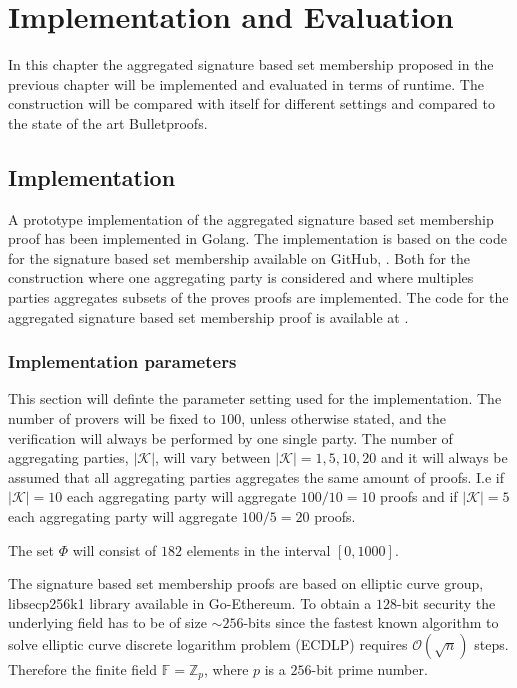 \chapter{Implementation and Evaluation}
\label{ch:results}
In this chapter the aggregated signature based set membership proposed in the previous chapter will be implemented and evaluated in terms of runtime. The construction will be compared with itself for different settings and compared to the state of the art Bulletproofs. 

\section{Implementation}
A prototype implementation of the aggregated signature based set membership proof  has been implemented in Golang. The implementation is based on the code for the signature based set membership available on GitHub, \cite{Git:RP}. Both for the construction where one aggregating party is considered and where multiples parties aggregates subsets of the proves proofs are implemented. The code for the aggregated signature based set membership proof is available at \cite{Git:MyCode}. 

\subsection*{Implementation parameters}
This section will definte the parameter setting  used for the implementation. The number of provers will be fixed to $100$, unless otherwise stated, and the verification will always be  performed by one single party. The number of aggregating parties, $|\mathcal{K}|$, will vary between $|\mathcal{K}| = 1,5,10,20$ and it will always be assumed that all aggregating parties aggregates the same amount of proofs. I.e if $|\mathcal{K}|=10$ each aggregating party will aggregate $100/10 =10 $ proofs and if $|\mathcal{K}|=5$ each aggregating party will aggregate $100/5 =20 $ proofs. 

The set $\Phi$ will consist of $182$ elements in the interval $[0,1000]$.  

The signature based set membership proofs are based on elliptic curve group, libsecp256k1 library available in Go-Ethereum. To obtain a $128$-bit security the underlying field has to be of size $\sim 256$-bits since the fastest known algorithm to solve elliptic curve discrete logarithm problem (ECDLP) requires $\mathcal{O}(\sqrt{n})$ steps. Therefore the finite field $\mathds{F}= \mathds{Z}_p$, where $p$ is a $256$-bit prime number. 
 
